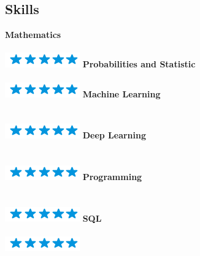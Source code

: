 \documentclass[]{friggeri-cv}
\begin{document}
\begin{aside}
    \section{Skills}
    \textbf{Mathematics}\\\vspace{-.08in}{\tiny 10+ years of experience}\\\includegraphics[scale=0.40]{img/5stars.png}  		
  	\textbf{Probabilities and Statistic}\\\vspace{-.08in}{\tiny 5+ years of experience}\\\includegraphics[scale=0.40]{img/5stars.png}  	
    \textbf{Machine Learning}\\\vspace{-.08in}{\tiny 2+ years of experience}\\\vspace{-.05in}{\scriptsize Scikit-Learn}\\\includegraphics[scale=0.40]{img/5stars.png}
    \textbf{Deep Learning}\\\vspace{-.08in}{\tiny 1+ years of experience}\\\vspace{-.05in}{\scriptsize Pytorch, Tensorflow, Keras}\\\includegraphics[scale=0.40]{img/5stars.png}  
  	\textbf{Programming}\\\vspace{-.08in}{\tiny 8+ years of experience}\\\vspace{-.05in}{\scriptsize Python, R \& Matlab}\\\includegraphics[scale=0.40]{img/5stars.png}   
    \textbf{SQL}\\\vspace{-.08in}{\tiny 3+ years of experience}\\\includegraphics[scale=0.40]{img/5stars.png}

\end{aside}
\end{document}
